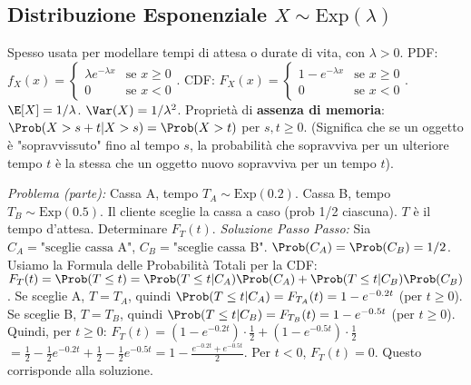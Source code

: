 \subsection{Distribuzione Esponenziale \texorpdfstring{$X \sim \text{Exp}(\lambda)$}{X ~ Exp(lambda)}}
Spesso usata per modellare tempi di attesa o durate di vita, con $\lambda > 0$.
PDF: $f_X(x) = \begin{cases} \lambda e^{-\lambda x} & \text{se } x \ge 0 \\ 0 & \text{se } x < 0 \end{cases}$.
CDF: $F_X(x) = \begin{cases} 1 - e^{-\lambda x} & \text{se } x \ge 0 \\ 0 & \text{se } x < 0 \end{cases}$.
$\E[X] = 1/\lambda$.
$\Var(X) = 1/\lambda^2$.
Proprietà di \textbf{assenza di memoria}: $\Prob(X > s+t | X > s) = \Prob(X > t)$ per $s, t \ge 0$.
(Significa che se un oggetto è "sopravvissuto" fino al tempo $s$, la probabilità che sopravviva per un ulteriore tempo $t$ è la stessa che un oggetto nuovo sopravviva per un tempo $t$).

\begin{example}
\textit{Problema (parte):} Cassa A, tempo $T_A \sim \text{Exp}(0.2)$. Cassa B, tempo $T_B \sim \text{Exp}(0.5)$. Il cliente sceglie la cassa a caso (prob 1/2 ciascuna). $T$ è il tempo d'attesa.
Determinare $F_T(t)$.
\textit{Soluzione Passo Passo:}
Sia $C_A = \text{"sceglie cassa A"}$, $C_B = \text{"sceglie cassa B"}$. $\Prob(C_A)=\Prob(C_B)=1/2$.
Usiamo la Formula delle Probabilità Totali per la CDF:
$F_T(t) = \Prob(T \le t) = \Prob(T \le t | C_A)\Prob(C_A) + \Prob(T \le t | C_B)\Prob(C_B)$.
Se sceglie A, $T=T_A$, quindi $\Prob(T \le t | C_A) = F_{T_A}(t) = 1 - e^{-0.2t}$ (per $t \ge 0$).
Se sceglie B, $T=T_B$, quindi $\Prob(T \le t | C_B) = F_{T_B}(t) = 1 - e^{-0.5t}$ (per $t \ge 0$).
Quindi, per $t \ge 0$:
$F_T(t) = (1 - e^{-0.2t}) \cdot \frac{1}{2} + (1 - e^{-0.5t}) \cdot \frac{1}{2}$
$= \frac{1}{2} - \frac{1}{2}e^{-0.2t} + \frac{1}{2} - \frac{1}{2}e^{-0.5t} = 1 - \frac{e^{-0.2t} + e^{-0.5t}}{2}$.
Per $t < 0$, $F_T(t)=0$.
Questo corrisponde alla soluzione.
\end{example}

